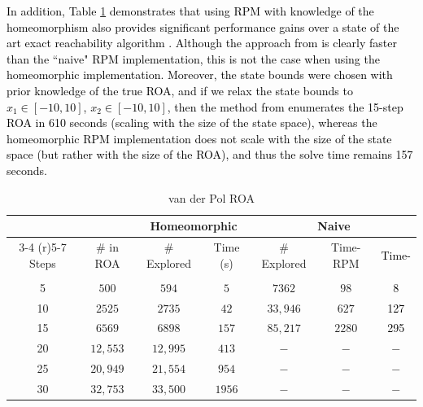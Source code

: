 \textcolor{black}{In addition, Table \ref{tab:van_der_pol} demonstrates that using RPM with knowledge of the homeomorphism also provides significant performance gains over a state of the art exact reachability algorithm \cite{yang2020reachability}.
Although the approach from \cite{yang2020reachability} is clearly faster than the ``naive" RPM implementation, this is not the case when using the homeomorphic implementation.
Moreover, the state bounds were chosen with prior knowledge of the true ROA, and if we relax the state bounds to $x_1 \in [-10, 10]$, $x_2 \in [-10, 10]$, then the method from \cite{yang2020reachability} enumerates the 15-step ROA in 610 seconds (scaling with the size of the state space), whereas the homeomorphic RPM implementation does not scale with the size of the state space (but rather with the size of the ROA), and thus the solve time remains 157 seconds.
}

\begingroup
\setlength{\tabcolsep}{2pt}
\begin{table}[h]
    \centering
    \caption{van der Pol ROA}
    {\fontsize{8}{10}\selectfont %
    \begin{tabular}{c c c c c c c}
        & &\multicolumn{2}{c}{\textbf{Homeomorphic}}&\multicolumn{3}{c}{\textbf{Naive}} \\
        \cmidrule(r){3-4}  \cmidrule(r){5-7}
        Steps& \# in ROA &\# Explored&Time (s) &\# Explored&Time-RPM&\textcolor{black}{Time-\cite{yang2020reachability}}\\ [0.5ex] 
        \hline \\ [-1.5ex]
        5    &$500$&$594$&$5$&$7362$&$98$&\textcolor{black}{8} \\
        10   &$2525$&$2735$&$42$&$33,946$&$627$&\textcolor{black}{127} \\
        15   &$6569$&$6898$&$157$&$85,217$&$2280$&\textcolor{black}{295} \\
        20   &$12,553$&$12,995$&$413$&$-$&$-$&$-$ \\
        25   &$20,949$&$21,554$&$954$&$-$&$-$&$-$ \\
        30   &$32,753$&$33,500$&$1956$&$-$&$-$&$-$
    \end{tabular}}
    \label{tab:van_der_pol}
\end{table} 
\endgroup



